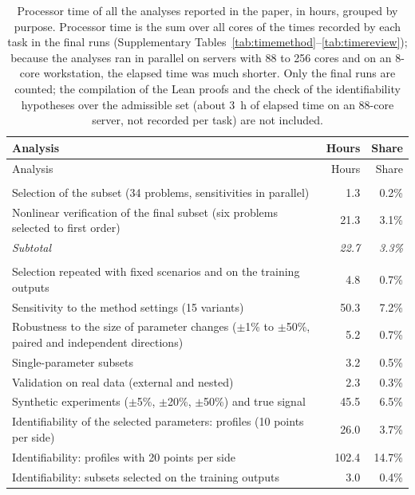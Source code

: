 \begin{longtable}{@{}>{\raggedright\arraybackslash}p{11.2cm}rr@{}}
\caption{Processor time of all the analyses reported in the paper, in hours, grouped by purpose. Processor time is the sum over all cores of the times recorded by each task in the final runs (Supplementary Tables~\ref{tab:timemethod}--\ref{tab:timereview}); because the analyses ran in parallel on servers with 88 to 256 cores and on an 8-core workstation, the elapsed time was much shorter. Only the final runs are counted; the compilation of the Lean proofs and the check of the identifiability hypotheses over the admissible set (about 3~h of elapsed time on an 88-core server, not recorded per task) are not included.}\label{tab:timebreakdown}\\
\toprule
Analysis & Hours & Share \\
\midrule
\endfirsthead
\toprule
Analysis & Hours & Share \\
\midrule
\endhead
\multicolumn{3}{@{}l}{\textbf{The method itself}} \\
\quad Selection of the subset (34 problems, sensitivities in parallel) & 1.3 & 0.2\% \\
\quad Nonlinear verification of the final subset (six problems selected to first order) & 21.3 & 3.1\% \\
\quad \emph{Subtotal} & \emph{22.7} & \emph{3.3\%} \\
\addlinespace
\multicolumn{3}{@{}l}{\textbf{Evaluation of the method}} \\
\quad Selection repeated with fixed scenarios and on the training outputs & 4.8 & 0.7\% \\
\quad Sensitivity to the method settings (15 variants) & 50.3 & 7.2\% \\
\quad Robustness to the size of parameter changes ($\pm$1\% to $\pm$50\%, paired and independent directions) & 5.2 & 0.7\% \\
\quad Single-parameter subsets & 3.2 & 0.5\% \\
\quad Validation on real data (external and nested) & 2.3 & 0.3\% \\
\quad Synthetic experiments ($\pm$5\%, $\pm$20\%, $\pm$50\%) and true signal & 45.5 & 6.5\% \\
\quad Identifiability of the selected parameters: profiles (10 points per side) & 26.0 & 3.7\% \\
\quad Identifiability: profiles with 20 points per side & 102.4 & 14.7\% \\
\quad Identifiability: subsets selected on the training outputs & 3.0 & 0.4\% \\

\end{longtable}
